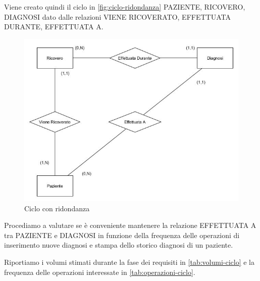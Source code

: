 \documentclass{article}
\begin{document}
Viene creato quindi il ciclo in \autoref{fig:ciclo-ridondanza} PAZIENTE, RICOVERO, DIAGNOSI dato dalle relazioni VIENE RICOVERATO, EFFETTUATA DURANTE, EFFETTUATA A.

\begin{figure}[H] %
      \centering
      \includegraphics[width=\linewidth]{schema3}
      \caption{Ciclo con ridondanza}
      \label{fig:ciclo-ridondanza}
    \end{figure}
Procediamo a valutare se è conveniente mantenere la relazione EFFETTUATA A tra PAZIENTE e DIAGNOSI in funzione della frequenza delle operazioni di inserimento nuove diagnosi e stampa dello storico diagnosi di un paziente.


Riportiamo i volumi stimati durante la fase dei requisiti in \autoref{tab:volumi-ciclo} e la frequenza delle operazioni interessate in \autoref{tab:operazioni-ciclo}.
\end{document}
